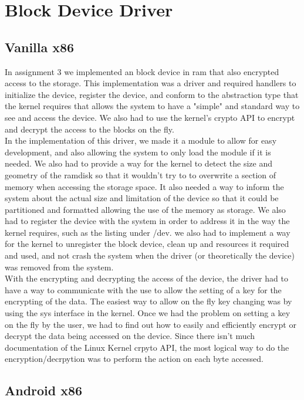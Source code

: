 \documentclass[letterpaper,10pt,titlepage]{article}
\begin{document}
\newpage
\section{Block Device Driver}
\subsection*{Vanilla x86}
In assignment 3 we implemented an block device in ram that also encrypted access to the storage. This implementation was a driver and required handlers to initialize the device, register the device, and conform to the abstraction type that the kernel requires that allows the system to have a "simple" and standard way to see and access the device. We also had to use the kernel's crypto API to encrypt and decrypt the access to the blocks on the fly.\\

In the implementation of this driver, we made it a module to allow for easy development, and also allowing the system to only load the module if it is needed. We also had to provide a way for the kernel to detect the size and geometry of the ramdisk so that it wouldn't try to to overwrite a section of memory when accessing the storage space. It also needed a way to inform the system about the actual size and limitation of the device so that it could be partitioned and formatted allowing the use of the memory as storage. We also had to register the device with the system in order to address it in the way the kernel requires, such as the listing under /dev. we also had to implement a way for the kernel to unregister the block device, clean up and resources it required and used, and not crash the system when the driver (or theoretically the device) was removed from the system.\\

With the encrypting and decrypting the access of the device, the driver had to have a way to communicate with the use to allow the setting of a key for the encrypting of the data. The easiest way to allow on the fly key changing was by using the sys interface in the kernel. Once we had the problem on setting a key on the fly by the user, we had to find out how to easily and efficiently encrypt or decrypt the data being accessed on the device. Since there isn't much documentation of the Linux Kernel crpyto API, the most logical way to do the encryption/decrpytion was to perform the action on each byte accessed.\\
\subsection*{Android x86}
\end{document}
